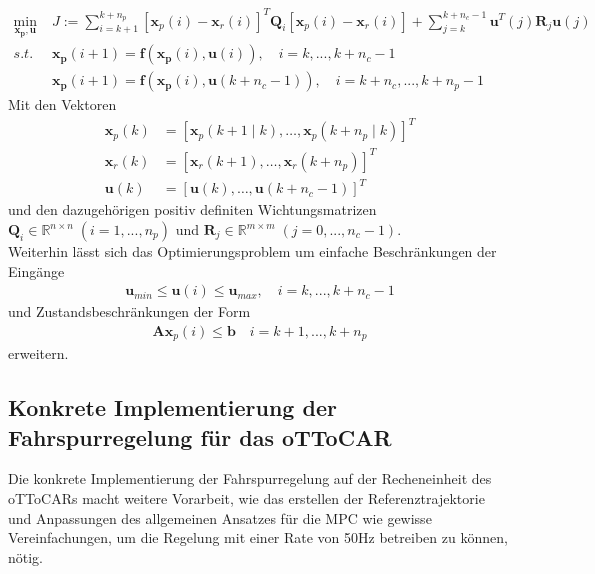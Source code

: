 \begin{align*}
	\underset{\boldsymbol{x_p, u}}{\text{min}}\;&J:=\sum_{i=k+1}^{k+n_p} \left [\boldsymbol{x}_{p}(i)-\boldsymbol{x}_{r}(i)\right ]^T\boldsymbol{Q}_i\left [\boldsymbol{x}_{p}(i)-\boldsymbol{x}_{r}(i)\right ] +\sum_{j=k}^{k+n_c-1} \boldsymbol{u}^T(j)\boldsymbol{R}_j\boldsymbol{u}(j)\\
	s.t.\;&\boldsymbol{x_p}(i+1)=\boldsymbol{f}\left ( \boldsymbol{x_p}(i), \boldsymbol{u}(i) \right ),\quad i=k,...,k+n_c-1\\
	&\boldsymbol{x_p}(i+1)=\boldsymbol{f}\left ( \boldsymbol{x_p}(i), \boldsymbol{u}(k+n_c-1) \right ),\quad i=k+n_c,...,k+n_p-1
\end{align*}
Mit den Vektoren
\begin{align*}
	\boldsymbol{x}_p(k)&=\left [ \boldsymbol{x}_p(k+1\mid k),\dots,\boldsymbol{x}_p(k+n_p\mid k) \right ]^T\\
	\boldsymbol{x}_r(k)&=\left [ \boldsymbol{x}_r(k+1),\dots,\boldsymbol{x}_r(k+n_p) \right ]^T\\
	\boldsymbol{u}(k)&=\left [ \boldsymbol{u}(k),\dots,\boldsymbol{u}(k+n_c-1) \right ]^T
\end{align*}
und den dazugehörigen positiv definiten Wichtungsmatrizen $\boldsymbol{Q}_i\in\mathbb{R}^{n\times n}\;(i=1, ...,n_p)$ und $\boldsymbol{R}_j\in\mathbb{R}^{m\times m}\;(j=0, ...,n_c-1)$.\\
Weiterhin lässt sich das Optimierungsproblem um einfache Beschränkungen der Eingänge
\begin{align*}
  \boldsymbol{u}_{min} \leq \boldsymbol{u}(i) \leq \boldsymbol{u}_{max},\quad i=k,...,k+n_c-1
\end{align*}
und Zustandsbeschränkungen der Form
\begin{align*}
  \boldsymbol{A}\boldsymbol{x}_p(i) \leq \boldsymbol{b}\quad i=k+1,...,k+n_p
\end{align*}
erweitern.

\subsection{Konkrete Implementierung der Fahrspurregelung für das oTToCAR}
Die konkrete Implementierung der Fahrspurregelung auf der Recheneinheit des oTToCARs macht weitere Vorarbeit, wie das erstellen der Referenztrajektorie und Anpassungen des allgemeinen Ansatzes für die MPC wie gewisse Vereinfachungen, um die Regelung mit einer Rate von 50Hz betreiben zu können, nötig.
